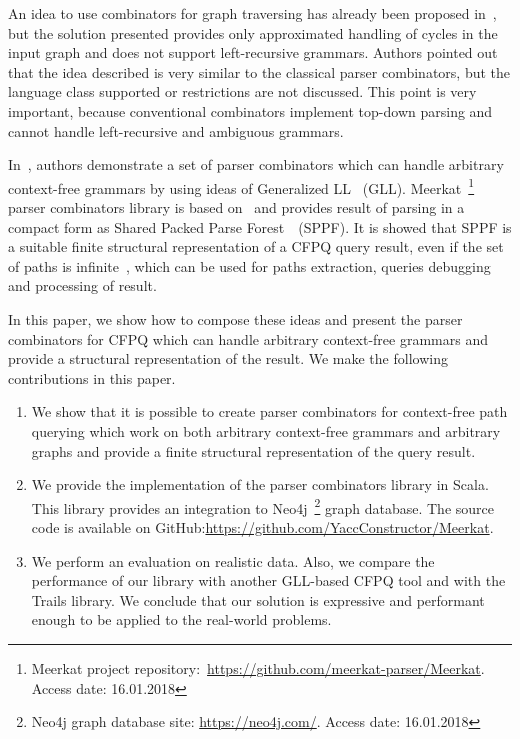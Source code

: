 An idea to use combinators for graph traversing has already been proposed in~\cite{ScalaGraphParsing}, but the solution presented provides only approximated handling of cycles in the input graph and does not support left-recursive grammars. 
Authors pointed out that the idea described is very similar to the classical parser combinators, but the language class supported or restrictions are not discussed.
This point is very important, because conventional combinators implement top-down parsing and cannot handle left-recursive and ambiguous grammars.

In~\cite{Meerkat}, authors demonstrate a set of parser combinators which can handle arbitrary context-free grammars by using ideas of Generalized LL~\cite{scott2010gll} (GLL).
Meerkat~\footnote{Meerkat project repository:~\url{https://github.com/meerkat-parser/Meerkat}. Access date: 16.01.2018} parser combinators library is based on~\cite{Meerkat}
 and provides result of parsing in a compact form as Shared Packed Parse Forest~\cite{SPPF}~(SPPF).
It is showed that SPPF is a suitable finite structural representation of a CFPQ query result, even if the set of paths is infinite~\cite{GrigorevR16}, which can be used for paths extraction, queries debugging and processing of result.

In this paper, we show how to compose these ideas and present the parser combinators for CFPQ which can handle arbitrary context-free grammars and provide a structural representation of the result.
We make the following contributions in this paper.

\begin{enumerate}
\item We show that it is possible to create parser combinators for context-free path querying which work on both arbitrary context-free grammars and arbitrary graphs and provide a finite structural representation of the query result.
\item We provide the implementation of the parser combinators library in Scala. This library provides an integration to Neo4j~\footnote{Neo4j graph database site: \url{https://neo4j.com/}. Access date: 16.01.2018} graph database. The source code is available on GitHub:\url{https://github.com/YaccConstructor/Meerkat}.
\item We perform an evaluation on realistic data. 
Also, we compare the performance of our library with another GLL-based CFPQ tool and with the Trails library.
We conclude that our solution is expressive and performant enough to be applied to the real-world problems. 
\end{enumerate}